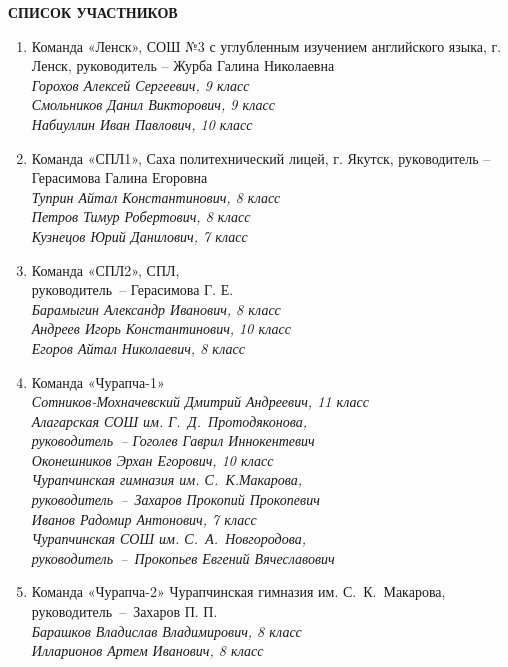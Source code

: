 \noindent\textbf{СПИСОК УЧАСТНИКОВ}
\begin{enumerate}
\item
Команда «Ленск», СОШ №3 с углубленным изучением английского языка, г. Ленск, руководитель –  Журба Галина Николаевна \\
\it
\indent Горохов Алексей Сергеевич, 9 класс\\
\indent Смольников Данил Викторович, 9 класс\\
\indent Набиуллин Иван Павлович, 10 класс
\rm
\item
Команда «СПЛ1», Саха политехнический лицей, г. Якутск, руководитель – Герасимова Галина Егоровна\\
\it
\indent Туприн Айтал Константинович, 8 класс	\\
\indent Петров Тимур Робертович, 8 класс\\
\indent Кузнецов Юрий Данилович, 7 класс
\rm
\item
Команда «СПЛ2»,	СПЛ, \\руководитель~– Герасимова Г. Е.\\
\it
\indent Барамыгин Александр Иванович, 8 класс\\
\indent Андреев Игорь Константинович, 10 класс\\
\indent Егоров Айтал Николаевич, 8 класс
\rm
\item
Команда «Чурапча-1»\\
\it
\indent Сотников-Мохначевский Дмитрий Андреевич, 11 класс\\
\rm Алагарская СОШ им. Г.~Д.~Протодяконова, \\руководитель~– Гоголев Гаврил Иннокентевич\\\it 
\indent Оконешников Эрхан Егорович, 10 класс\\
\rm Чурапчинская гимназия им. С.~К.Макарова, \\руководитель~– Захаров Прокопий Прокопевич\\\it 
\indent Иванов Радомир Антонович, 7 класс\\
\rm Чурапчинская СОШ им. С.~А.~Новгородова, \\руководитель~– Прокопьев Евгений Вячеславович\it 
\rm
\item
Команда «Чурапча-2»	Чурапчинская гимназия им. С.~К.~Макарова,\\ руководитель~– Захаров П. П.\\
\it
\indent Барашков Владислав Владимирович,	8 класс	\\
\indent Илларионов Артем Иванович, 8 класс\\

\end{enumerate}
